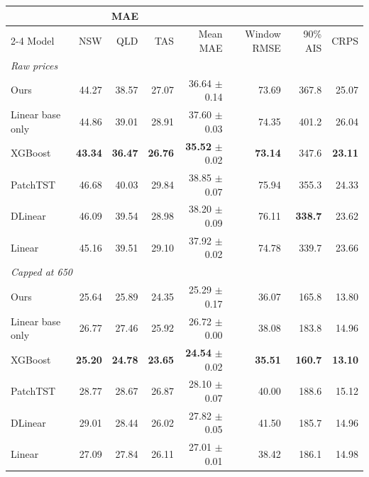 \begin{tabular}{lrrrrrrr}
\toprule
& \multicolumn{3}{c}{MAE} & & & & \\
\cmidrule(lr){2-4}
Model & NSW & QLD & TAS & Mean MAE & Window RMSE & 90\% AIS & CRPS \\
\midrule
\multicolumn{8}{l}{\emph{Raw prices}} \\
Ours & 44.27 & 38.57 & 27.07 & 36.64 $\pm$ 0.14 & 73.69 & 367.8 & 25.07 \\
Linear base only & 44.86 & 39.01 & 28.91 & 37.60 $\pm$ 0.03 & 74.35 & 401.2 & 26.04 \\
XGBoost & \textbf{43.34} & \textbf{36.47} & \textbf{26.76} & \textbf{35.52} $\pm$ 0.02 & \textbf{73.14} & 347.6 & \textbf{23.11} \\
PatchTST & 46.68 & 40.03 & 29.84 & 38.85 $\pm$ 0.07 & 75.94 & 355.3 & 24.33 \\
DLinear & 46.09 & 39.54 & 28.98 & 38.20 $\pm$ 0.09 & 76.11 & \textbf{338.7} & 23.62 \\
Linear & 45.16 & 39.51 & 29.10 & 37.92 $\pm$ 0.02 & 74.78 & 339.7 & 23.66 \\
\midrule
\multicolumn{8}{l}{\emph{Capped at 650}} \\
Ours & 25.64 & 25.89 & 24.35 & 25.29 $\pm$ 0.17 & 36.07 & 165.8 & 13.80 \\
Linear base only & 26.77 & 27.46 & 25.92 & 26.72 $\pm$ 0.00 & 38.08 & 183.8 & 14.96 \\
XGBoost & \textbf{25.20} & \textbf{24.78} & \textbf{23.65} & \textbf{24.54} $\pm$ 0.02 & \textbf{35.51} & \textbf{160.7} & \textbf{13.10} \\
PatchTST & 28.77 & 28.67 & 26.87 & 28.10 $\pm$ 0.07 & 40.00 & 188.6 & 15.12 \\
DLinear & 29.01 & 28.44 & 26.02 & 27.82 $\pm$ 0.05 & 41.50 & 185.7 & 14.96 \\
Linear & 27.09 & 27.84 & 26.11 & 27.01 $\pm$ 0.01 & 38.42 & 186.1 & 14.98 \\
\bottomrule
\end{tabular}

